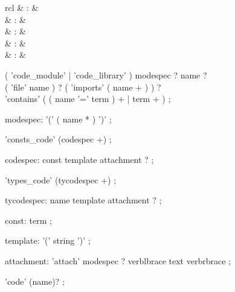 \begin{isabellebody}
\begin{isamarkuptext}
  \begin{matharray}{rcl}
    \hypertarget{command.HOL.code-module}{\hyperlink{command.HOL.code-module}{\mbox{}}} & : &  \\
    \hypertarget{command.HOL.code-library}{\hyperlink{command.HOL.code-library}{\mbox{}}} & : &  \\
    \hypertarget{command.HOL.consts-code}{\hyperlink{command.HOL.consts-code}{\mbox{}}} & : &  \\
    \hypertarget{command.HOL.types-code}{\hyperlink{command.HOL.types-code}{\mbox{}}} & : &  \\  
    \hypertarget{attribute.HOL.code}{\hyperlink{attribute.HOL.code}{\mbox{}}} & : &  \\
  \end{matharray}

  \begin{rail}
  ( 'code\_module' | 'code\_library' ) modespec ? name ? \\
    ( 'file' name ) ? ( 'imports' ( name + ) ) ? \\
    'contains' ( ( name '=' term ) + | term + )
  ;

  modespec: '(' ( name * ) ')'
  ;

  'consts\_code' (codespec +)
  ;

  codespec: const template attachment ?
  ;

  'types\_code' (tycodespec +)
  ;

  tycodespec: name template attachment ?
  ;

  const: term
  ;

  template: '(' string ')'
  ;

  attachment: 'attach' modespec ? verblbrace text verbrbrace
  ;

  'code' (name)?
  ;
  \end{rail}


\end{isamarkuptext}
\end{isabellebody}
